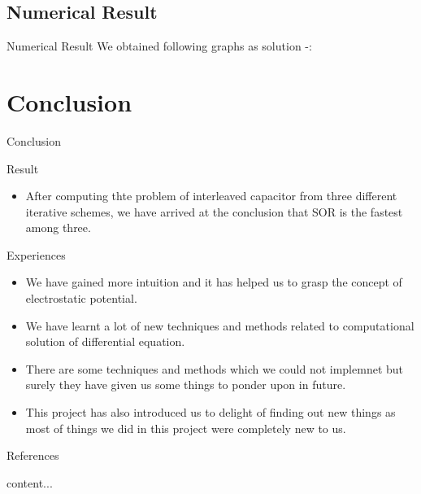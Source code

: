 \documentclass[9 pt]{beamer}
\begin{document}
				\subsection{Numerical Result}
				\begin{frame}{Numerical Result}
					We obtained following graphs as solution -: \\
					
				\end{frame}
				\section{Conclusion}
					\begin{frame}{Conclusion}
						\begin{block}{Result}
							\begin{itemize}
								\item After computing thte problem of interleaved capacitor from three different iterative schemes, we have arrived at the conclusion that SOR is the fastest among three.
							\end{itemize}
							\end{block}
						\begin{block}{Experiences}
							\begin{itemize}
								\item We have gained more intuition and it has helped us to grasp the concept of electrostatic potential.
								\item We have learnt a lot of new techniques and methods related to computational solution of differential equation.
								\item There are some techniques and methods which we could not implemnet  but surely they have given us some things to ponder upon in future.
								\item This project has also  introduced us to delight of finding out new things as most of things we did in this project were completely new to us.
							\end{itemize}
						\end{block}
							
					\end{frame}
				\begin{frame}{References}
					
					content...
				\end{frame}
\end{document}

